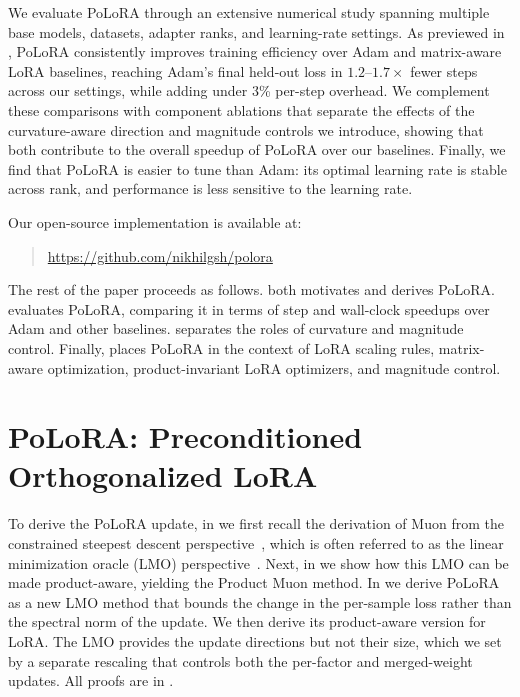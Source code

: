 \documentclass[11pt]{article}
\newcommand{\methodname}{PoLoRA\xspace}
\theoremstyle{plain}
\theoremstyle{definition}
\theoremstyle{remark}
\theoremstyle{definition}
\begin{document}
We evaluate \methodname{} through an extensive numerical study spanning multiple base models, datasets, adapter ranks, and learning-rate settings. As previewed in , \methodname{} consistently improves training efficiency over Adam and matrix-aware LoRA baselines, reaching Adam's final held-out loss in $1.2$--$1.7\times$ fewer steps across our settings, while adding under 3\% per-step overhead. We complement these comparisons with component ablations that separate the effects of the curvature-aware direction and magnitude controls we introduce, showing that both contribute to the overall speedup of \methodname{} over our baselines.
 Finally, we find that \methodname{} is  easier to tune than Adam: its optimal learning rate is stable across rank, and performance is less sensitive to the learning rate.



Our open-source implementation is available at:
\begin{quote}\centering
{\color{blue}\url{https://github.com/nikhilgsh/polora}}
\end{quote}


The rest of the paper proceeds as follows.  both motivates and derives \methodname{}.
 evaluates \methodname{}, comparing it in terms of step and wall-clock speedups over Adam and other baselines.
 separates the roles of curvature and magnitude control.
Finally,  places \methodname{} in the context of LoRA scaling rules, matrix-aware optimization, product-invariant LoRA optimizers, and magnitude control.

\section{\texorpdfstring{\methodname{}}{PoLoRA}: Preconditioned Orthogonalized LoRA}



\label{sec:method}
To derive the \methodname{} update, in  we first recall the derivation of Muon from the constrained steepest descent perspective~\cite{crawshaw2026exploration}, which is often referred to as the  linear minimization oracle (LMO) perspective~\cite{pmlr-v267-pethick25a}. 
Next, in  we show how this LMO can be made product-aware, yielding the Product Muon method. 
In  we derive \methodname{}  as a new LMO method that bounds the change in the per-sample loss rather than the spectral norm of the update. We then derive its product-aware version for LoRA. The LMO provides the update directions but not their size, which we set by a separate rescaling that controls both the per-factor and merged-weight updates. All proofs are in .
\end{document}
